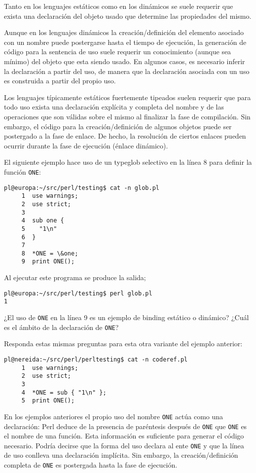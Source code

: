 \begin{exercise}
Tanto en los lenguajes estáticos como en los dinámicos
se suele requerir que exista una declaración del objeto usado que determine las propiedades del mismo.

Aunque en los lenguajes dinámicos la creación/definición del elemento asociado
con un nombre puede postergarse hasta el tiempo de ejecución, la generación de
código para la sentencia de uso suele requerir un conocimiento (aunque sea
mínimo) del objeto que esta siendo usado. En algunos casos, es necesario
inferir la declaración a partir del uso, de manera que la declaración asociada
con un uso es construida a partir del propio uso.

Los lenguajes típicamente estáticos fuertemente tipeados suelen requerir que
para todo uso exista una declaración explícita y completa del nombre y de las
operaciones que son válidas sobre el mismo al finalizar la fase de compilación.
Sin embargo, el código para la creación/definición de algunos objetos puede ser
postergado a la fase de enlace. De hecho, la resolución de ciertos enlaces
pueden ocurrir durante la fase de ejecución (énlace dinámico). 

El siguiente ejemplo hace uso de un typeglob selectivo en la línea 8 para 
definir la función \verb|ONE|:
\begin{verbatim}
pl@europa:~/src/perl/testing$ cat -n glob.pl
     1  use warnings;
     2  use strict;
     3
     4  sub one {
     5    "1\n"
     6  }
     7
     8  *ONE = \&one;
     9  print ONE();
\end{verbatim}
Al ejecutar este programa se produce la salida;
\begin{verbatim}
pl@europa:~/src/perl/testing$ perl glob.pl
1
\end{verbatim}
 ¿El uso de \verb|ONE| en la línea 9 es un ejemplo de binding estático o dinámico?
¿Cuál es el ámbito de la declaración de \verb|ONE|?

Responda estas mismas preguntas para esta otra variante del ejemplo anterior:

\begin{verbatim}
pl@nereida:~/src/perl/perltesting$ cat -n coderef.pl
     1  use warnings;
     2  use strict;
     3
     4  *ONE = sub { "1\n" };
     5  print ONE();
\end{verbatim}
\end{exercise}

En los ejemplos anteriores el propio uso del nombre \verb|ONE| 
actúa como una declaración: Perl deduce 
de la presencia de paréntesis después de \verb|ONE| que \verb|ONE| es el nombre de una función.
Esta información es suficiente para generar el código necesario. Podría decirse
que la forma del uso declara al ente \verb|ONE| y que la línea de uso conlleva una declaración
implícita. Sin embargo, la creación/definición completa de \verb|ONE| es postergada hasta la fase de 
ejecución.

